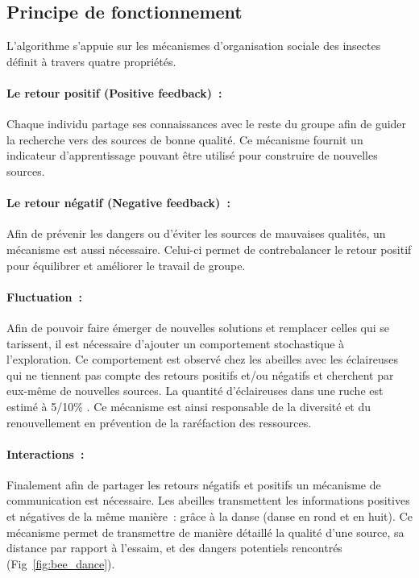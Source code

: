 \subsection{Principe de fonctionnement} %
\label{sub:principe_de_fonctionnement}
L’algorithme s’appuie sur les mécanismes d’organisation sociale des insectes
\parencite{Bonabeau1999} définit à travers quatre propriétés.

\paragraph{Le retour positif (Positive feedback)~:} %
\label{par:positive_feedback}
Chaque individu partage ses connaissances avec le reste du groupe afin de guider
la recherche vers des sources de bonne qualité. Ce mécanisme fournit un indicateur
d’apprentissage pouvant être utilisé pour construire de nouvelles sources.

\paragraph{Le retour négatif (Negative feedback)~:} %
\label{par:negative_feedback}
Afin de prévenir les dangers ou d’éviter les sources de mauvaises qualités, un
mécanisme est aussi nécessaire. Celui-ci permet de contrebalancer le retour
positif pour équilibrer et améliorer le travail de groupe.

\paragraph{Fluctuation~:} %
\label{par:fluctuation}
Afin de pouvoir faire émerger de nouvelles solutions et remplacer celles qui se tarissent,
il est nécessaire d’ajouter un comportement stochastique à l’exploration. Ce comportement
est observé chez les abeilles avec les éclaireuses qui ne tiennent pas compte des retours
positifs et/ou négatifs et cherchent par eux-même de nouvelles sources. La quantité
d’éclaireuses dans une ruche est estimé à 5/10\si{\percent} \parencite{Seeley1996}. Ce
mécanisme est ainsi responsable de la diversité et du renouvellement en prévention de la
raréfaction des ressources.

\paragraph{Interactions~:} %
\label{par:intractions}
Finalement afin de partager les retours négatifs et positifs un mécanisme de
communication est nécessaire.
Les abeilles transmettent les informations positives et négatives de la même
manière~: grâce à la danse (danse en rond et en huit).
Ce mécanisme permet de transmettre de manière détaillé la qualité d’une source, sa
distance par rapport à l’essaim, et des dangers potentiels rencontrés (Fig~\ref{fig:bee_dance}).

